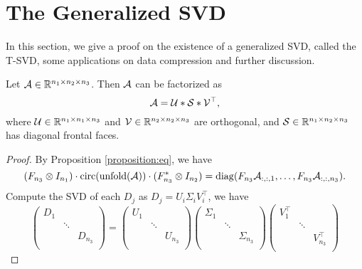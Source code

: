 \section{The Generalized SVD}

In this section, we give a proof on the existence of a generalized SVD, called the T-SVD, some applications on data compression and further discussion.

\begin{theorem}
    Let $\mathcal{A}\in{\mathbb{R}}^{n_1\times n_2\times n_3}$. Then $\mathcal{A}$ can be factorized as
    $$\mathcal{A} = \mathcal{U}*\mathcal{S}*\mathcal{V}^\top,$$
    where $\mathcal{U}\in{\mathbb{R}}^{n_1\times n_1\times n_3}$ and $\mathcal{V}\in{\mathbb{R}}^{n_2\times n_2\times n_3}$ are orthogonal, and $\mathcal{S}\in{\mathbb{R}}^{n_1\times n_2\times n_3}$ has diagonal frontal faces.
\end{theorem}

\begin{proof}
    By Proposition \ref{proposition:eq}, we have
    $$(F_{n_3}\otimes I_{n_1}) \cdot \mathrm{circ}(\mathrm{unfold}(\A)) \cdot (F_{n_3}^*\otimes I_{n_2}) = \mathrm{diag}(F_{n_3}\A_{:,:,1}, \ldots, F_{n_3}\A_{:,:,n_3}).$$
    Compute the SVD of each $D_{j}$ as $D_j = U_i\Sigma_iV_i^\top$, we have
    $$    \begin{pmatrix}
            D_1 &        &         \\
                & \ddots &         \\
                &        & D_{n_3} \\
        \end{pmatrix} = \begin{pmatrix}
            U_1 &        &         \\
                & \ddots &         \\
                &        & U_{n_3} \\
        \end{pmatrix} \begin{pmatrix}
            \Sigma_1 &        &              \\
                     & \ddots &              \\
                     &        & \Sigma_{n_3} \\
        \end{pmatrix}\begin{pmatrix}
            V_1^\top &        &              \\
                     & \ddots &              \\
                     &        & V_{n_3}^\top \\

\end{pmatrix}$$
\end{proof}

